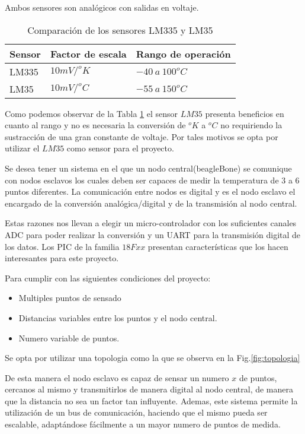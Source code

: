 Ambos sensores son analógicos con salidas en voltaje.
\begin{table}[H]
  \begin{tabular}{l l l}
    \toprule
    \textbf{Sensor} & \textbf{Factor de escala} & \textbf{Rango de operación} \\
    \toprule
    LM335 & $10mV/^o K$ & $-40~a~100 ^o C$\\
    LM35  & $10mV/^o C$ & $-55~a~150 ^o C$\\
    \bottomrule
  \end{tabular}
  \caption{Comparación de los sensores LM335 y LM35}
  \label{tab:compSens}
\end{table}

Como podemos observar de la Tabla \ref{tab:compSens} el sensor $LM35$ presenta beneficios 
en cuanto al rango y no es necesaria la conversión de $^o K$ a $^o C$ no requiriendo la
sustracción de una gran constante de voltaje. Por tales motivos se opta por utilizar el
$LM35$ como sensor para el proyecto.

Se desea tener un sistema en el que un nodo central(beagleBone) se comunique con nodos esclavos
los cuales deben ser capaces de medir la temperatura de 3 a 6 puntos diferentes. La comunicación
entre nodos es digital y es el nodo esclavo el encargado de la conversión analógica/digital
y de la transmisión al nodo central.

Estas razones nos llevan a elegir un micro-controlador con los suficientes canales ADC para
poder realizar la conversión y un UART para la transmisión digital de los datos. Los PIC de 
la familia $18Fxx$ presentan características que los hacen interesantes para este proyecto.

Para cumplir con las siguientes condiciones del proyecto:
\begin{itemize}
 \item Multiples puntos de sensado
 \item Distancias variables entre los puntos y el nodo central.
 \item Numero variable de puntos.
\end{itemize}
Se opta por utilizar una topologia como la que se observa en la Fig.\ref{fig:topologia}



De esta manera el nodo esclavo es capaz de sensar un numero $x$ de puntos, cercanos al mismo
y transmitirlos de manera digital al nodo central, de manera que la distancia no sea un factor 
tan influyente. Ademas, este sistema permite la utilización de un bus de comunicación, haciendo 
que el mismo pueda ser escalable, adaptándose fácilmente a un mayor numero de
puntos de medida.


